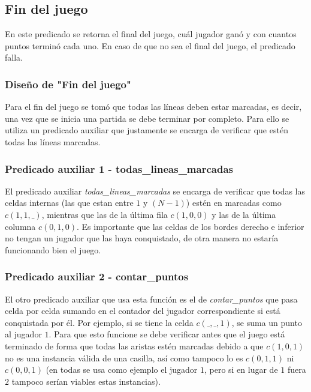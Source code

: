 \documentclass[12pt]{article} %
\begin{document}
		\subsection{Fin del juego}
		En este predicado se retorna el final del juego, cuál jugador ganó y con cuantos puntos terminó cada uno. En caso de que no sea el final del juego, el predicado falla.
		
			\subsubsection{Diseño de "Fin del juego"}
			Para el fin del juego se tomó que todas las líneas deben estar marcadas, es decir, una vez que se inicia una partida se debe terminar por completo. Para ello se utiliza un predicado auxiliar que justamente se encarga de verificar que estén todas las líneas marcadas.\\
			
			\subsubsection{Predicado auxiliar 1 - todas\_lineas\_marcadas}
			El predicado auxiliar \textit{todas\_lineas\_marcadas} se encarga de verificar que todas las celdas internas (las que estan entre $1$ y $(N-1)$) estén en marcadas como $c(1,1,\_)$, mientras que las de la última fila $c(1,0,0)$ y las de la última columna $c(0,1,0)$. Es importante que las celdas de los bordes derecho e inferior no tengan un jugador que las haya conquistado, de otra manera no estaría funcionando bien el juego.\\
			
			\subsubsection{Predicado auxiliar 2 - contar\_puntos}
			El otro predicado auxiliar que usa esta función es el de \textit{contar\_puntos} que pasa celda por celda sumando en el contador del jugador correspondiente si está conquistada por él. Por ejemplo, si se tiene la celda $c(\_,\_,1)$, se suma un punto al jugador $1$. Para que esto funcione se debe verificar antes que el juego está terminado de forma que todas las aristas estén marcadas debido a que $c(1,0,1)$ no es una instancia válida de una casilla, así como tampoco lo es $c(0,1,1)$ ni $c(0,0,1)$ (en todas se usa como ejemplo el jugador $1$, pero si en lugar de $1$ fuera $2$ tampoco serían viables estas instancias).
			
		
	
\end{document}
